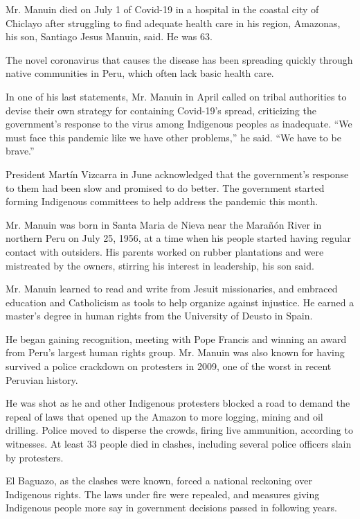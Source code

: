 Mr. Manuin died on July 1 of Covid-19 in a hospital in the coastal city
of Chiclayo after struggling to find adequate health care in his region,
Amazonas, his son, Santiago Jesus Manuin, said. He was 63.

The novel coronavirus that causes the disease has been spreading quickly
through native communities in Peru, which often lack basic health care.

In one of his last statements, Mr. Manuin in April called on tribal
authorities to devise their own strategy for containing Covid-19's
spread, criticizing the government's response to the virus among
Indigenous peoples as inadequate. ``We must face this pandemic like we
have other problems,'' he said. ``We have to be brave.''

President Martín Vizcarra in June acknowledged that the government's
response to them had been slow and promised to do better. The government
started forming Indigenous committees to help address the pandemic this
month.

Mr. Manuin was born in Santa Maria de Nieva near the Marañón River in
northern Peru on July 25, 1956, at a time when his people started having
regular contact with outsiders. His parents worked on rubber plantations
and were mistreated by the owners, stirring his interest in leadership,
his son said.

Mr. Manuin learned to read and write from Jesuit missionaries, and
embraced education and Catholicism as tools to help organize against
injustice. He earned a master's degree in human rights from the
University of Deusto in Spain.

He began gaining recognition, meeting with Pope Francis and winning an
award from Peru's largest human rights group. Mr. Manuin was also known
for having survived a police crackdown on protesters in 2009, one of the
worst in recent Peruvian history.

He was shot as he and other Indigenous protesters blocked a road to
demand the repeal of laws that opened up the Amazon to more logging,
mining and oil drilling. Police moved to disperse the crowds, firing
live ammunition, according to witnesses. At least 33 people died in
clashes, including several police officers slain by protesters.

El Baguazo, as the clashes were known, forced a national reckoning over
Indigenous rights. The laws under fire were repealed, and measures
giving Indigenous people more say in government decisions passed in
following years.

